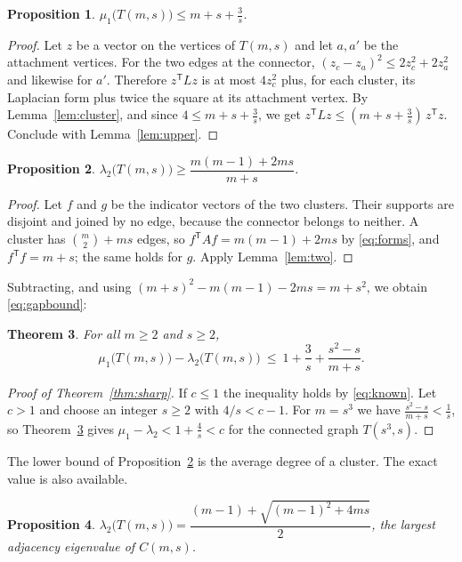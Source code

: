 \documentclass[11pt]{amsart}
\newtheorem{theorem}{Theorem}[section]
\newtheorem{proposition}[theorem]{Proposition}
\theoremstyle{definition}
\theoremstyle{remark}
\newcommand{\tr}{^{\mathsf{T}}}
\begin{document}
\begin{proposition}\label{prop:Tmu}
$\mu_1\bigl(T(m,s)\bigr)\le m+s+\frac{3}{s}$.
\end{proposition}

\begin{proof}
Let $z$ be a vector on the vertices of $T(m,s)$ and let $a,a'$ be the attachment vertices. For
the two edges at the connector, $(z_c-z_a)^2\le2z_c^2+2z_a^2$ and likewise for $a'$. Therefore
$z\tr Lz$ is at most $4z_c^2$ plus, for each cluster, its Laplacian form plus twice the square at
its attachment vertex. By Lemma~\ref{lem:cluster}, and since $4\le m+s+\frac3s$, we get
$z\tr Lz\le(m+s+\frac3s)\,z\tr z$. Conclude with Lemma~\ref{lem:upper}.
\end{proof}

\begin{proposition}\label{prop:Tlambda}
$\lambda_2\bigl(T(m,s)\bigr)\ge\dfrac{m(m-1)+2ms}{m+s}$.
\end{proposition}

\begin{proof}
Let $f$ and $g$ be the indicator vectors of the two clusters. Their supports are disjoint and
joined by no edge, because the connector belongs to neither. A cluster has
$\binom m2+ms$ edges, so $f\tr Af=m(m-1)+2ms$ by \eqref{eq:forms}, and $f\tr f=m+s$; the same
holds for $g$. Apply Lemma~\ref{lem:two}.
\end{proof}

Subtracting, and using $(m+s)^2-m(m-1)-2ms=m+s^2$, we obtain \eqref{eq:gapbound}:

\begin{theorem}\label{thm:gap}
For all $m\ge2$ and $s\ge2$,
\[
\mu_1\bigl(T(m,s)\bigr)-\lambda_2\bigl(T(m,s)\bigr)\ \le\ 1+\frac{3}{s}+\frac{s^2-s}{m+s} .
\]
\end{theorem}

\begin{proof}[Proof of Theorem~\ref{thm:sharp}]
If $c\le1$ the inequality holds by \eqref{eq:known}. Let $c>1$ and choose an integer $s\ge2$
with $4/s<c-1$. For $m=s^3$ we have $\frac{s^2-s}{m+s}<\frac1s$, so Theorem~\ref{thm:gap} gives
$\mu_1-\lambda_2<1+\frac4s<c$ for the connected graph $T(s^3,s)$.
\end{proof}

The lower bound of Proposition~\ref{prop:Tlambda} is the average degree of a cluster. The exact
value is also available.

\begin{proposition}\label{prop:exact}
$\lambda_2\bigl(T(m,s)\bigr)=\dfrac{(m-1)+\sqrt{(m-1)^2+4ms}}{2}$, the largest adjacency
eigenvalue of $C(m,s)$.
\end{proposition}
\end{document}
